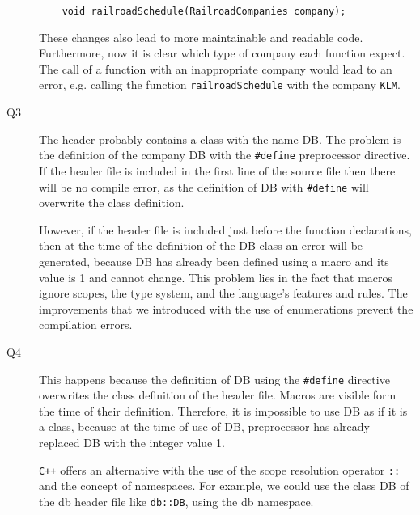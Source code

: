 \documentclass[a4paper]{article}
\newcounter{exerciseCount}
\newcommand{\exercise}[1]{\addtocounter{exerciseCount}{1} \noindent \medskip {\large \textsf{\textbf{Exercise \arabic{exerciseCount} #1}}} \par}
\begin{document}
\begin{description}
\begin{verbatim}
	void railroadSchedule(RailroadCompanies company);
	\end{verbatim}
	
	These changes also lead to more maintainable and readable code. Furthermore, now it is clear which type of company each function expect. The call of a function with an inappropriate company would lead to an error, e.g. calling the function \verb|railroadSchedule| with the company \verb|KLM|.
	\item[Q3]\-
	The header probably contains a class with the name DB. The problem is the definition of the company DB with the \verb|#define| preprocessor directive. If the header file is included in the first line of the source file then there will be no compile error, as the definition of DB with \verb|#define| will overwrite the class definition.
	
	However, if the header file is included just before the function declarations, then at the time of the definition of the DB class an error will be generated, because DB has already been defined using a macro and its value is 1 and cannot change. This problem lies in the fact that macros ignore scopes, the type system, and the language's features and rules. The improvements that we introduced with the use of enumerations prevent the compilation errors.
	\item[Q4]\-
	This happens because the definition of DB using the \verb|#define| directive overwrites the class definition of the header file. Macros are visible form the time of their definition. Therefore, it is impossible to use DB as if it is a class, because at the time of use of DB, preprocessor has already replaced DB with the integer value 1.
	
	\verb|C++| offers an alternative with the use of the scope resolution operator \verb|::| and the concept of namespaces. For example, we could use the class DB of the db header file like \verb|db::DB|, using the db namespace.
\end{description}

\exercise{}
\end{document}
